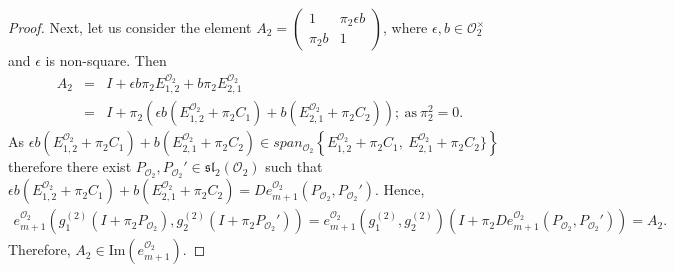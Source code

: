 \documentclass[10pt,twoside]{amsart}
\newcommand{\im}{\mathrm{Im}}
\theoremstyle{definition}
\theoremstyle{definition}
\begin{document}
\begin{proof}
Next, let us consider the element $A_2 = \left(\begin{array}{cc} 1 & \pi_2\epsilon b \\ \pi_2 b & 1 \end{array}\right)$, where $\epsilon, b \in \mathcal{O}_2^{\times}$ and $\epsilon$ is non-square. Then
\begin{eqnarray*}
A_2 &=& I+\epsilon b\pi_2E_{1,2}^{\mathcal{O}_2}+ b\pi_2E_{2,1}^{\mathcal{O}_2} \\ &=& I+\pi_2\left(\epsilon b(E_{1,2}^{\mathcal{O}_2}+\pi_2C_1)+b(E_{2,1}^{\mathcal{O}_2}+\pi_2C_2)\right); \ \text{as}\ \pi_2^2=0.
\end{eqnarray*}
As $\epsilon b(E_{1,2}^{\mathcal{O}_2} + \pi_2C_1) + b(E_{2,1}^{\mathcal{O}_2} + \pi_2C_2) \in span_{\mathcal{O}_2} \left\{E^{\mathcal{O}_2}_{1,2} + \pi_2 C_1,\ E^{\mathcal{O}_2}_{2,1} + \pi_2C_2\}\right\}$ therefore there exist $P_{\mathcal{O}_2}, P_{\mathcal{O}_2}' \in \mathfrak{sl}_2(\mathcal{O}_2)$ such that $\epsilon b(E_{1,2}^{\mathcal{O}_2} + \pi_2C_1)+b(E_{2,1}^{\mathcal{O}_2}+\pi_2C_2) = De_{m+1}^{\mathcal{O}_2}(P_{\mathcal{O}_2}, P_{\mathcal{O}_2}')$. Hence, 
\begin{eqnarray*}
e_{m+1}^{\mathcal{O}_2}(g_1^{(2)}(I + \pi_2P_{\mathcal{O}_2}), g_2^{(2)}(I + \pi_2P_{\mathcal{O}_2}'))  = e_{m+1}^{\mathcal{O}_2}(g_1^{(2)},g_2^{(2)})\left(I+\pi_2De_{m+1}^{\mathcal{O}_2}(P_{\mathcal{O}_2}, P_{\mathcal{O}_2}')\right) = A_2.
\end{eqnarray*}
Therefore, $A_2\in \im(e_{m+1}^{\mathcal{O}_2})$.


\end{proof}
\end{document}
